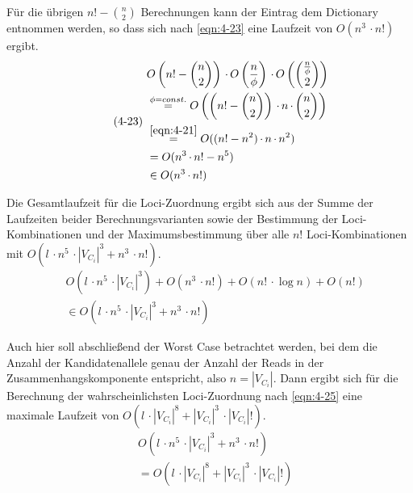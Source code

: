 Für die übrigen $n! - \binom{n}{2}$ Berechnungen kann der Eintrag dem Dictionary entnommen werden, so dass sich nach \eqref{eqn:4-23} eine Laufzeit von $O(n^3  \, \cdotp n!)$ ergibt.
\begin{equation} \label{eqn:4-23}
\tag{4-23}
\begin{aligned}
&\ {} O\left( n! - \binom{n}{2}\right)  \, \cdotp O\left(\frac{n}{\phi} \right) \, \cdotp O\left( \binom{\frac{n}{\phi}}{2}\right) \\
&\ \stackrel{\phi = const.}{=} O\left( \left( n! - \binom{n}{2}\right)  \, \cdotp n \, \cdotp \binom{n}{2} \right)\\
&\ \stackrel{\eqref{eqn:4-21}}{=} O((n! - n^2)  \, \cdotp n \, \cdotp n^2)\\
&\ = O( n^3 \, \cdotp n! - n^5)\\
&\ \in O(n^3  \, \cdotp n!)\\
\end{aligned}
\end{equation}

Die Gesamtlaufzeit für die Loci-Zuordnung ergibt sich aus der Summe der Laufzeiten beider Berechnungsvarianten sowie der Bestimmung der Loci-Kombinationen und der Maximumsbestimmung über alle $n!$ Loci-Kombinationen mit $O( l\, \cdotp n^5  \, \cdotp |V_{C_{i}}|^3 + n^3  \, \cdotp n!)$. 
\begin{equation} \label{eqn:4-24}
\tag{4-24}
\begin{aligned}
&\ {} O( l\, \cdotp n^5  \, \cdotp |V_{C_{i}}|^3) + O(n^3  \, \cdotp n!) + O(n ! \, \cdotp \log n) + O(n!) \\
&\ \in O( l\, \cdotp n^5  \, \cdotp |V_{C_{i}}|^3 + n^3  \, \cdotp n!)
\end{aligned}
\end{equation}

Auch hier soll abschließend der Worst Case betrachtet werden, bei dem die Anzahl der Kandidatenallele genau der Anzahl der Reads in der Zusammenhangskomponente entspricht, also $ n = |V_{C_{i}}| $. Dann ergibt sich für die Berechnung der wahrscheinlichsten Loci-Zuordnung nach \eqref{eqn:4-25} eine maximale Laufzeit von $ O( l \, \cdotp |V_{C_{i}}|^8 + |V_{C_{i}}|^3  \, \cdotp |V_{C_{i}}|!) $.
\begin{equation} \label{eqn:4-25}
\tag{4-25}
\begin{aligned}
&\ {} O( l\, \cdotp n^5  \, \cdotp |V_{C_{i}}|^3 + n^3  \, \cdotp n!)\\
&\ = O( l \, \cdotp |V_{C_{i}}|^8 + |V_{C_{i}}|^3  \, \cdotp |V_{C_{i}}|!)
\end{aligned}
\end{equation}

